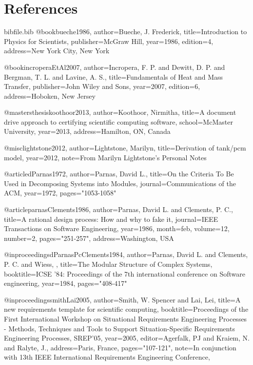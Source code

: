 \documentclass[12pt]{article}
\begin{document}
\section{References}
\label{Sec:References}
\begin{filecontents*}{bibfile.bib}
@book{bueche1986,
author={Bueche, J. Frederick},
title={Introduction to Physics for Scientists},
publisher={McGraw Hill},
year={1986},
edition={4},
address={New York City, New York}}

@book{incroperaEtAl2007,
author={Incropera, F. P. and Dewitt, D. P. and Bergman, T. L. and Lavine, A. S.},
title={Fundamentals of Heat and Mass Transfer},
publisher={John Wiley and Sons},
year={2007},
edition={6},
address={Hoboken, New Jersey}}

@mastersthesis{koothoor2013,
author={Koothoor, Nirmitha},
title={A document drive approach to certifying scientific computing software},
school={McMaster University},
year={2013},
address={Hamilton, ON, Canada}}

@misc{lightstone2012,
author={Lightstone, Marilyn},
title={Derivation of tank/pcm model},
year={2012},
note={From Marilyn Lightstone's Personal Notes}}

@article{dParnas1972,
author={Parnas, David L.},
title={On the Criteria To Be Used in Decomposing Systems into Modules},
journal={Communications of the ACM},
year={1972},
pages={"1053-1058"}}

@article{parnasClements1986,
author={Parnas, David L. and Clements, P. C.},
title={A rational design process: How and why to fake it},
journal={IEEE Transactions on Software Engineering},
year={1986},
month={feb},
volume={12},
number={2},
pages={"251-257"},
address={Washington, USA}}

@inproceedings{dParnasPcClements1984,
author={Parnas, David L. and Clements, P. C. and Wiess, },
title={The Modular Structure of Complex Systems},
booktitle={ICSE '84: Proceedings of the 7th international conference on Software engineering},
year={1984},
pages={"408-417"}}

@inproceedings{smithLai2005,
author={Smith, W. Spencer and Lai, Lei},
title={A new requirements template for scientific computing},
booktitle={Proceedings of the First International Workshop on Situational Requirements Engineering Processes - Methods, Techniques and Tools to Support Situation-Specific Requirements Engineering Processes, SREP'05},
year={2005},
editor={Agerfalk, PJ and Kraiem, N. and Ralyte, J.},
address={Paris, France},
pages={"107-121"},
note={In conjunction with 13th IEEE International Requirements Engineering Conference,}}
\end{filecontents*}
\nocite{*}
\printbibliography[heading=none]
\end{document}
